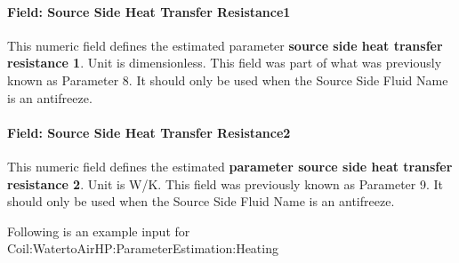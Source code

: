 \paragraph{Field: Source Side Heat Transfer Resistance1}\label{field-source-side-heat-transfer-resistance1-1}

This numeric field defines the estimated parameter \textbf{source side heat transfer resistance 1}. Unit is dimensionless. This field was part of what was previously known as Parameter 8. It should only be used when the Source Side Fluid Name is an antifreeze.

\paragraph{Field: Source Side Heat Transfer Resistance2}\label{field-source-side-heat-transfer-resistance2-1}

This numeric field defines the estimated \textbf{parameter source side heat transfer resistance 2}. Unit is W/K. This field was previously known as Parameter 9. It should only be used when the Source Side Fluid Name is an antifreeze.

Following is an example input for Coil:WatertoAirHP:ParameterEstimation:Heating

